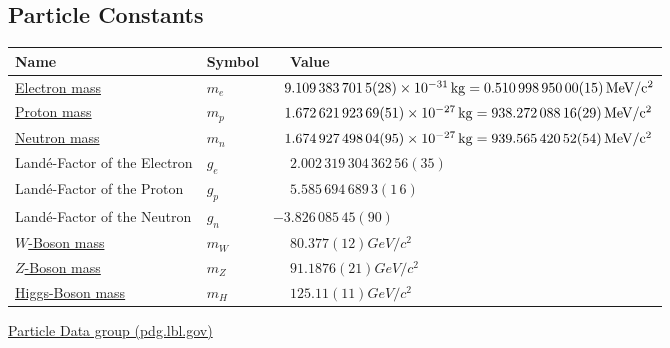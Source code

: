 	\subsection{Particle Constants}
		\label{Sec:ParticleConstants}
		\begin{center}
			\begin{tabular}{| L{.35\textwidth} L{.15\textwidth} L{.4\textwidth} |}
				\hline Name & Symbol & $\phantom{-}$Value \\ \hline \hline
				\href{https://en.wikipedia.org/wiki/Electron_mass}{Electron mass} & $m_e$ & $\phantom{-}9.109\,383\,701\,5(28)\times 10^{-31}\,\mathrm{kg} = 0.510\,998\,950\,00(15)\,\mathrm{MeV/c^2}$ \\ \hline
				\href{https://en.wikipedia.org/wiki/Proton}{Proton mass} & $m_p$ & $\phantom{-}1.672\,621\,923\,69(51)\times 10^{-27}\,\mathrm{kg} = 938.272\,088\,16(29)\,\mathrm{MeV/c^2}$ \\ \hline
				\href{https://en.wikipedia.org/wiki/Neutron}{Neutron mass} & $m_n$ & $\phantom{-}1.674\,927\,498\, 04(95)\times 10^{-27}\,\mathrm{kg} = 939.565\,420\,52(54)\,\mathrm{MeV/c^2}$ \\ \hline
				Landé-Factor of the Electron & $g_e$ & $\phantom{-}2.002\,319\,304\,362\,56(35)$ \\ \hline
				Landé-Factor of the Proton & $g_p$ & $\phantom{-}5.585\,694\,689\,3(1\,6)$ \\ \hline
				Landé-Factor of the Neutron & $g_n$ & $- 3.826\,085\,45(90)$ \\ \hline
				\href{https://en.wikipedia.org/wiki/W_and_Z_bosons#W_bosons}{$W$-Boson mass} & $m_W$ & $\phantom{-}80.377(12)\unit{GeV/c^2}$ \\ \hline
				\href{https://en.wikipedia.org/wiki/W_and_Z_bosons#W_bosons}{$Z$-Boson mass} & $m_Z$ & $\phantom{-}91.1876(21)\unit{GeV/c^2}$ \\ \hline
				\href{https://en.wikipedia.org/wiki/Higgs_boson}{Higgs-Boson mass} & $m_H$ & $\phantom{-}125.11(11)\unit{GeV/c^2}$ \\ \hline
			\end{tabular}
		\end{center}

		\href{https://pdg.lbl.gov/}{Particle Data group (pdg.lbl.gov)}



